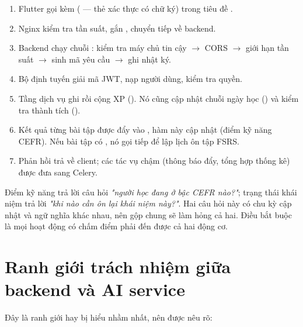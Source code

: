 \begin{enumerate}[leftmargin=1.4em]
  \item Flutter gọi  kèm
   ( — thẻ xác thực có chữ ký) trong tiêu đề .
  \item Nginx kiểm tra tần suất, gắn , chuyển tiếp về backend.
  \item Backend chạy chuỗi : kiểm tra máy chủ tin cậy $\rightarrow$ CORS
  $\rightarrow$ giới hạn tần suất $\rightarrow$ sinh mã yêu cầu $\rightarrow$ ghi nhật ký.
  \item Bộ định tuyến giải mã JWT, nạp người dùng, kiểm tra quyền.
  \item Tầng dịch vụ ghi  rồi cộng XP (). Nó
  cũng cập nhật chuỗi ngày học () và kiểm tra thành tích
  ().
  \item Kết quả từng bài tập được đẩy vào ,
  hàm này cập nhật  (điểm kỹ năng CEFR). Nếu bài tập có
  , nó gọi tiếp  để lập lịch ôn
  tập FSRS.
  \item Phản hồi trả về client; các tác vụ chậm (thông báo đẩy, tổng hợp thống kê) được
  đưa sang Celery.
\end{enumerate}

\begin{luuy}
Điểm kỹ năng trả lời câu hỏi \textit{"người học đang ở bậc CEFR nào?"}; trạng thái khái
niệm trả lời \textit{"khi nào cần ôn lại khái niệm này?"}. Hai câu hỏi này có chu kỳ cập
nhật và ngữ nghĩa khác nhau, nên gộp chung sẽ làm hỏng cả hai. Điều bắt buộc là mọi hoạt
động có chấm điểm phải đến được cả hai động cơ.
\end{luuy}

\section{Ranh giới trách nhiệm giữa backend và AI service}
\label{sec:ranh-gioi-be-ai}

Đây là ranh giới hay bị hiểu nhầm nhất, nên được nêu rõ:

